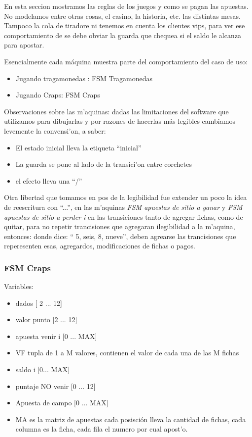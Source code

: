 
En esta seccion mostramos las reglas de los juegos y como se pagan las apuestas.
No modelamos entre otras cosas, el casino, la historia, etc. las distintas mesas.
Tampoco la cola de tiradore ni tenemos en cuenta los clientes vips, para ver ese
comportamiento de se debe obviar la guarda que chequea si el saldo le alcanza para apostar.

Esencialmente cada máquina muestra parte del comportamiento del caso de uso:
\begin{itemize}
 \item Jugando tragamonedas : FSM Tragamonedas
 \item Jugando Craps: FSM Craps
\end{itemize}

Observaciones sobre las m'aquinas:
dadas las limitaciones del software que utilizamos para dibujarlas y por razones 
de hacerlas más legibles cambiamos levemente la convensi'on, a saber:
\begin{itemize}
 \item El estado inicial lleva la etiqueta ``inicial''
\item La guarda se pone al lado de la transici'on entre corchetes
\item el efecto lleva una ``/''
\end{itemize}

Otra libertad que tomamos en pos de la legibilidad fue extender un poco 
la idea de reescritura con ``...'', en las m'aquinas \textit{FSM apuestas de sitio a ganar} y \textit{FSM apuestas de sitio a perder i} en las transiciones tanto de agregar fichas, como de quitar, para no repetir trancisiones que agregaran ilegibilidad a la m'aquina, entonces:
donde dice: `` 5, seis, 8, nueve'', deben agrearse las trancisiones que reperesenten esas, agregardos, modificaciones de 
fichas o pagos.






	\subsubsection{FSM Craps}
Variables:
\begin{itemize}
\item dados [ 2 ... 12]
\item valor punto [2 ... 12]
\item apuesta venir i [0 ... MAX]
\item VF tupla de 1 a M valores, contienen el valor de cada una de las M fichas
\item saldo i [0... MAX]
\item puntaje NO venir [0 ... 12]
\item Apuesta de campo [0 ...  MAX]
\item MA es la matriz de apuestas cada posisción lleva la cantidad de fichas, cada columna es la ficha, cada fila el numero por cual apost'o.
\end{itemize}



